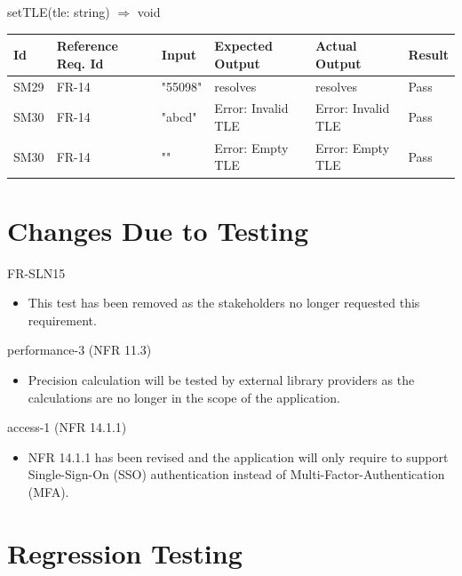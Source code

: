 \documentclass[12pt, titlepage]{article}
\begin{document}
setTLE(tle: string) $\Rightarrow$ void

\begin{center}
\begin{tabular}{|p{1cm} | p{2cm} |p{2cm}| p{2cm} |p{2cm}| p{2cm}|}
\hline
\textbf{Id} & \textbf{Reference Req. Id} & \textbf{Input} & \textbf{Expected Output} & \textbf{Actual Output} & \textbf{Result} \\
\hline
SM29 & FR-14 & { "55098" } & resolves
 & resolves & Pass
\\
\hline
SM30 & FR-14 & { "abcd" } & Error: Invalid TLE
 & Error: Invalid TLE & Pass
 \\
\hline
SM30 & FR-14 & { "" } & Error: Empty TLE
 & Error: Empty TLE & Pass
 \\
 \hline
\end{tabular}

\end{center}




\section{Changes Due to Testing}


FR-SLN15
\begin{itemize}
\item This test has been removed as the stakeholders no longer requested this requirement.
\end{itemize}

performance-3 (NFR 11.3)
\begin{itemize}
\item Precision calculation will be tested by external library providers as the calculations are no longer in the scope of the application.
\end{itemize}

access-1 (NFR 14.1.1)
\begin{itemize}
\item NFR 14.1.1 has been revised and the application will only require to support Single-Sign-On (SSO) authentication instead of Multi-Factor-Authentication (MFA).
\end{itemize}

\section{Regression Testing}
\end{document}
